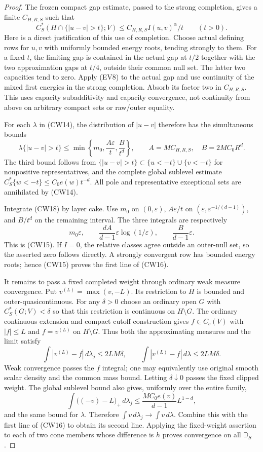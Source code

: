 \documentclass[11pt,a4paper]{article}
\numberwithin{equation}{section}
\theoremstyle{definition}
\theoremstyle{remark}
\begin{document}
\begin{proof}
The frozen compact gap estimate, passed to the strong
completion, gives a finite $C_{H,R,S}$ such that
\[
 C_S^*(H\cap\{|u-v|>t\};V)
       \leq C_{H,R,S} I(u,v)^\alpha/t\qquad(t>0).
 \tag{CW17}
\]
Here is a direct justification of this use of completion.
Choose actual defining rows for $u,v$ with uniformly
bounded energy roots, tending strongly to them. For a
fixed $t$, the limiting gap is contained in the actual
gap at $t/2$ together with the two approximation gaps
at $t/4$, outside their common null set. The latter
two capacities tend to zero. Apply (EV8) to the actual
gap and use continuity of the mixed first energies in
the strong completion. Absorb its factor two in
$C_{H,R,S}$. This uses capacity subadditivity and
capacity convergence, not continuity from above on
arbitrary compact sets or raw/outer equality.

For each $\lambda$ in (CW14), the distribution of
$|u-v|$ therefore has the simultaneous bounds
\[
 \lambda\{|u-v|>t\}
       \leq\min\left\{m_0,\frac{A\varepsilon}{t},
                            \frac{B}{t^d}\right\},
 \qquad A=MC_{H,R,S},\quad B=2MC_0R^d.
 \tag{CW18}
\]
The third bound follows from
$\{|u-v|>t\}\subset\{u<-t\}\cup\{v<-t\}$ for
nonpositive representatives, and the complete global
sublevel estimate $C_S^*\{w<-t\}\leq C_0e(w)t^{-d}$.
All pole and representative exceptional sets are
annihilated by (CW14).

Integrate (CW18) by layer cake. Use $m_0$ on
$(0,\varepsilon)$, $A\varepsilon/t$ on
$(\varepsilon,\varepsilon^{-1/(d-1)})$, and $B/t^d$
on the remaining interval. The three integrals are
respectively
\[
       m_0\varepsilon,\qquad
       \frac{dA}{d-1}\varepsilon\log(1/\varepsilon),
       \qquad \frac{B}{d-1}\varepsilon.
\]
This is (CW15). If $I=0$, the relative classes agree
outside an outer-null set, so the asserted zero follows
directly. A strongly convergent row has bounded energy
roots; hence (CW15) proves the first line of (CW16).

It remains to pass a fixed completed weight through
ordinary weak measure convergence. Put
$v^{(L)}=\max(v,-L)$. Its restriction to $H$ is bounded
and outer-quasicontinuous. For any $\delta>0$ choose
an ordinary open $G$ with $C_S^*(G;V)<\delta$ so
that this restriction is continuous on $H\setminus G$.
The ordinary continuous extension and compact cutoff
construction gives $f\in C_c(V)$ with $|f|\leq L$
and $f=v^{(L)}$ on $H\setminus G$. Thus both the
approximating measures and the limit satisfy
\[
       \int|v^{(L)}-f|\,d\lambda_j\leq2LM\delta,
       \qquad
       \int|v^{(L)}-f|\,d\lambda\leq2LM\delta.
\]
Weak convergence passes the $f$ integral; one may
equivalently use original smooth scalar density and
the common mass bound. Letting $\delta\downarrow0$
passes the fixed clipped weight. The global sublevel
bound also gives, uniformly over the entire family,
\[
 \int\bigl((-v)-L\bigr)_+\,d\lambda_j
       \leq\frac{MC_0e(v)}{d-1}L^{1-d},
\]
and the same bound for $\lambda$. Therefore
$\int v\,d\lambda_j\to\int v\,d\lambda$.
Combine this with the first line of (CW16) to obtain
its second line. Applying the fixed-weight assertion
to each of two cone members whose difference is $h$
proves convergence on all $\mathbb D_S$.


\end{proof}
\end{document}
